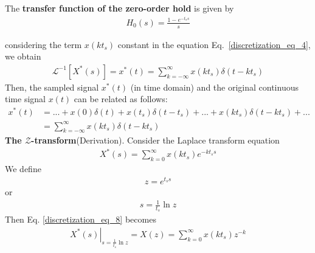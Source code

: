 \documentclass[11pt,a4paper,oneside]{book}
\numberwithin{equation}{section}
\theoremstyle{it}
\theoremstyle{definition}
\begin{document}
\begin{mybox}
	The \textbf{transfer function of the zero-order hold} is given by
	\begin{equation}\label{discretization_eq_5}
		\begin{split}
			H_0(s) = \frac{1-e^{-t_ss}}{s}
		\end{split}
	\end{equation}
\end{mybox}
considering  the term $x(kt_s)$ constant in the equation 
Eq.~\ref{discretization_eq_4}, we obtain
\begin{equation}\label{discretization_eq_6}
	\begin{split}
		\mathcal{L}^{-1}\left[ X^*(s) \right] = x^*(t) = \sum_{k=-\infty}^{\infty}x(kt_s)\delta(t-kt_s)
	\end{split}
\end{equation}
Then,  the sampled signal $x^*(t)$ (in time domain) and the original continuous 
time signal $x(t)$ can be related as follows:
\begin{equation}\label{discretization_eq_7}
	\begin{split}
		x^*(t) &= ... + x(0)\delta(t)+x(t_s)\delta(t-t_s)+...+x(kt_s)\delta(t-kt_s)+...\\[6pt]
		&= \sum_{k=-\infty}^{\infty}x(kt_s)\delta(t-kt_s)
	\end{split}
\end{equation}
\noindent\textbf{The $\mathbf{\mathcal{Z}}$-transform}(Derivation). Consider 
the Laplace transform equation 
\begin{equation}\label{discretization_eq_8}
	\begin{split}
		X^*(s) = \sum_{k=0}^{\infty} x(kt_s)e^{-kt_ss} 
	\end{split}
\end{equation}
We define 
\begin{equation*}\label{discretization_eq_9}
	\begin{split}
		z=e^{t_ss} 
	\end{split}
\end{equation*}
or 
\begin{equation*}\label{discretization_eq_10}
	\begin{split}
		s=\frac{1}{t_s}\ln z 
	\end{split}
\end{equation*}
Then Eq. \ref{discretization_eq_8} becomes
\begin{equation}\label{discretization_eq_11}
	\begin{split}
		\left. X^*(s)\right|_{s=\frac{1}{t_s}\ln z }  = X(z) = 
		\sum_{k=0}^{\infty} x(kt_s)z^{-k} 
	\end{split}
\end{equation}
\end{document}
